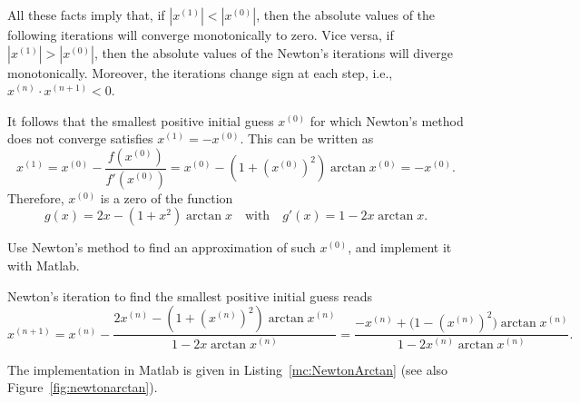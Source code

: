 \begin{problem}[Newton's method for \texorpdfstring{$F(x):=\arctan x$}{\emph{F(x):=arctan x} \coreproblem}]
\begin{subproblem}[4]
\begin{solution}
All these facts imply that, if $|x^{(1)}|<|x^{(0)}|$, then the absolute values of the following iterations will converge monotonically to zero.
Vice versa, if $|x^{(1)}|>|x^{(0)}|$, then  the absolute values of the Newton's iterations will diverge monotonically.
Moreover, the iterations change sign at each step, i.e., $x^{(n)}\cdot x^{(n+1)}<0$.

It follows that the smallest positive initial guess $x^{(0)}$ for which Newton's method does not converge satisfies  $x^{(1)}= -x^{(0)}$.
This can be written as
$$x^{(1)}=x^{(0)}-\frac{f(x^{(0)})}{f'(x^{(0)})}=x^{(0)}-(1+(x^{(0)})^2)\arctan{x^{(0)}}= - x^{(0)}.$$
   Therefore, $x^{(0)}$ is  a zero of the function
    $$g(x)=2x-(1+x^2)\arctan{x} \quad \text{with} \quad g'(x)=1-2x\arctan{x}.$$
   \end{solution}
\end{subproblem}

\begin{subproblem}[2]
Use Newton's method to find an approximation of such $x^{(0)}$, and implement it with Matlab.
\cprotEnv\begin{solution}
    Newton's iteration to find the smallest positive initial guess reads
    $$x^{(n+1)}=x^{(n)}-\frac{2x^{(n)}-(1+(x^{(n)})^2)\arctan{x^{(n)}}}{1-2x\arctan{x^{(n)}}}
= \frac{ -x^{(n)}+\big(1-(x^{(n)})^2\big)\arctan x^{(n)} }{1-2x^{(n)}\arctan x^{(n)}}.$$

The implementation in Matlab is given in Listing~\ref{mc:NewtonArctan} (see also Figure~\ref{fig:newtonarctan}).







\end{solution}
\end{subproblem}

\end{problem}



%





